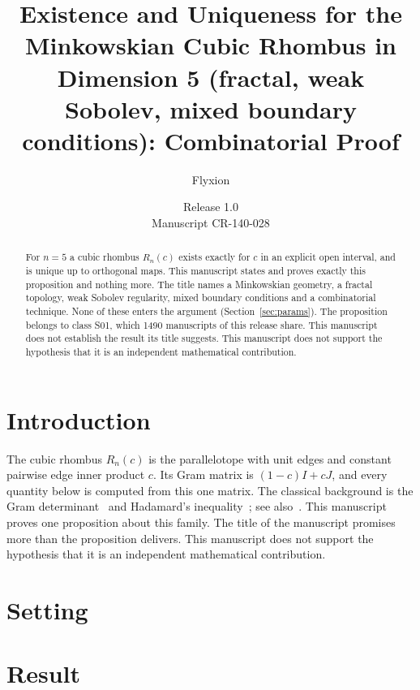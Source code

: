 \documentclass[11pt]{article}
\title{Existence and Uniqueness for the Minkowskian Cubic Rhombus in Dimension 5 (fractal, weak Sobolev, mixed boundary conditions): Combinatorial Proof}
\author{Flyxion}
\date{Release 1.0\\ Manuscript CR-140-028}
\begin{document}
\maketitle
\begin{abstract}
For $n=5$ a cubic rhombus $R_n(c)$ exists exactly for $c$ in an explicit open interval, and is unique up to orthogonal maps. This manuscript states and proves exactly this proposition and nothing more. The title names a Minkowskian geometry, a fractal topology, weak Sobolev regularity, mixed boundary conditions and a combinatorial technique. None of these enters the argument (Section~\ref{sec:params}). The proposition belongs to class S01, which 1490 manuscripts of this release share. This manuscript does not establish the result its title suggests. This manuscript does not support the hypothesis that it is an independent mathematical contribution.
\end{abstract}

\section{Introduction}
The cubic rhombus $R_n(c)$ is the parallelotope with unit edges and constant pairwise edge inner product $c$. Its Gram matrix is $(1-c)I+cJ$, and every quantity below is computed from this one matrix. The classical background is the Gram determinant~\cite{gram} and Hadamard's inequality~\cite{hadamard}; see also~\cite{hj}.
This manuscript proves one proposition about this family. The title of the manuscript promises more than the proposition delivers. This manuscript does not support the hypothesis that it is an independent mathematical contribution.

\section{Setting}


\section{Result}

\end{document}
